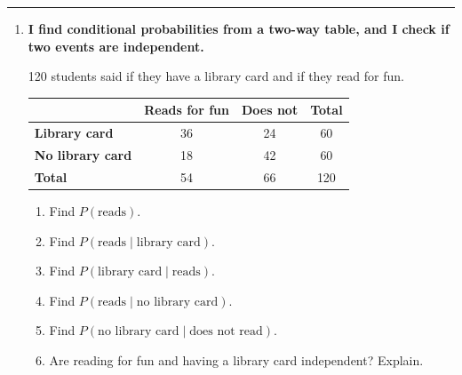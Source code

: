 \documentclass[11pt]{article}
\newcommand{\lessonhead}[1]{\par\vspace{0.6em}{\large\bfseries #1}\par\vspace{0.25em}\hrule\vspace{0.6em}}
\newcommand{\goal}[1]{\textbf{#1}\par\vspace{0.35em}}
\begin{document}
\newpage
\lessonhead{6.3 - Conditional Probability}
\begin{enumerate}[resume]

\item \goal{I find conditional probabilities from a two-way table, and I check if two events are independent.}
120 students said if they have a library card and if they read for fun.
\begin{center}
\renewcommand{\arraystretch}{1.4}
\begin{tabular}{|l|c|c|c|}\hline
 & \textbf{Reads for fun} & \textbf{Does not} & \textbf{Total} \\ \hline
\textbf{Library card} & 36 & 24 & 60 \\ \hline
\textbf{No library card} & 18 & 42 & 60 \\ \hline
\textbf{Total} & 54 & 66 & 120 \\ \hline
\end{tabular}
\end{center}
\begin{enumerate}
  \item Find $P(\text{reads})$. 
  \work{1.5em}
  \item Find $P(\text{reads} \mid \text{library card})$. 
  \work{1.5em}
  \item Find $P(\text{library card} \mid \text{reads})$. 
  \work{1.5em}
  \item Find $P(\text{reads} \mid \text{no library card})$. 
  \work{1.5em}
  \item Find $P(\text{no library card} \mid \text{does not read})$. 
  \work{1.5em}
  \item Are reading for fun and having a library card independent? Explain.

  \work{2em}
\end{enumerate}


\end{enumerate}
\end{document}

